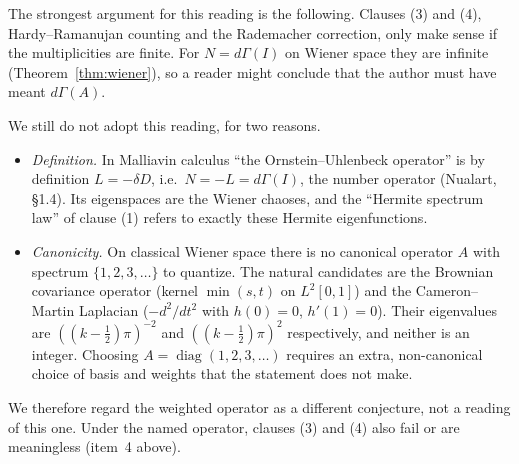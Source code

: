 \documentclass[11pt]{article}
\theoremstyle{definition}
\theoremstyle{remark}
\begin{document}
\begin{enumerate}
The strongest argument for this reading is the following. Clauses (3) and (4), Hardy--Ramanujan
counting and the Rademacher correction, only make sense if the multiplicities are finite.
For $N=d\Gamma(I)$ on Wiener space they are infinite (Theorem~\ref{thm:wiener}), so a reader
might conclude that the author must have meant $d\Gamma(A)$.

We still do not adopt this reading, for two reasons.
\begin{itemize}
\item \emph{Definition.} In Malliavin calculus ``the Ornstein--Uhlenbeck operator'' is by
definition $L=-\delta D$, i.e.\ $N=-L=d\Gamma(I)$, the number operator (Nualart,
\S1.4). Its eigenspaces are the Wiener chaoses, and the ``Hermite spectrum law'' of
clause (1) refers to exactly these Hermite eigenfunctions.
\item \emph{Canonicity.} On classical Wiener space there is no canonical operator $A$ with
spectrum $\{1,2,3,\dots\}$ to quantize. The natural candidates are the Brownian
covariance operator (kernel $\min(s,t)$ on $L^2[0,1]$) and the Cameron--Martin
Laplacian ($-d^2/dt^2$ with $h(0)=0$, $h'(1)=0$). Their eigenvalues are
$((k-\frac12)\pi)^{-2}$ and $((k-\frac12)\pi)^2$ respectively, and neither is an integer.
Choosing $A=\operatorname{diag}(1,2,3,\dots)$ requires an extra, non-canonical choice of
basis and weights that the statement does not make.
\end{itemize}
We therefore regard the weighted operator as a different conjecture, not a reading of
this one. Under the named operator, clauses (3) and (4) also fail or are meaningless
(item~4 above).
\end{enumerate}
\end{document}
